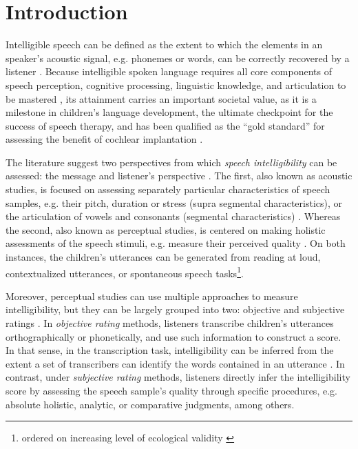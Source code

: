 \section{Introduction} \label{S:introduction}

Intelligible speech can be defined as the extent to which the elements in an speaker's acoustic signal, e.g. phonemes or words, can be correctly recovered by a listener \citep{Kent_et_al_1989, Whitehill_et_al_2004, vanHeuven_2008, Freeman_et_al_2017}. Because intelligible spoken language requires all core components of speech perception, cognitive processing, linguistic knowledge, and articulation to be mastered \citep{Freeman_et_al_2017}, its attainment carries an important societal value, as it is a milestone in children's language development, the ultimate checkpoint for the success of speech therapy, and has been qualified as the ``gold standard'' for assessing the benefit of cochlear implantation \citep{Chin_et_al_2012}. 

The literature suggest two perspectives from which \textit{speech intelligibility} can be assessed: the message and listener's perspective \citep{Boonen_et_al_2020, Boonen_et_al_2021}. The first, also known as acoustic studies, is focused on assessing separately particular characteristics of speech samples, e.g. their pitch, duration or stress (supra segmental characteristics), or the articulation of vowels and consonants (segmental characteristics) \citep{Rowe_et_al_2018}. Whereas the second, also known as perceptual studies, is centered on making holistic assessments of the speech stimuli, e.g. measure their perceived quality \citep{Boonen_et_al_2020, Boonen_et_al_2021}. On both instances, the children's utterances can be generated from reading at loud, contextualized utterances, or spontaneous speech tasks\footnote{ordered on increasing level of ecological validity \citep{Flipsen_2006,Ertmer_2011}}.

\begin{comment}
Based on their description, it seems that perceptual are more subjective than acoustic studies, as they do not rely on "objective" measurements, i.e. time duration, wave amplitude, among others, available in the former. However, for the case of SI, there are objective and subjective assessment methodologies.
\end{comment}

Moreover, perceptual studies can use multiple approaches to measure intelligibility, but they can be largely grouped into two: objective and subjective ratings \citep{Hustad_et_al_2020}. In \textit{objective rating} methods, listeners transcribe children's utterances orthographically or phonetically, and use such information to construct a score. In that sense, in the transcription task, intelligibility can be inferred from the extent a set of transcribers can identify the words contained in an utterance \cite{Boonen_et_al_2021}. In contrast, under \textit{subjective rating} methods, listeners directly infer the intelligibility score by assessing the speech sample's quality through specific procedures, e.g. absolute holistic, analytic, or comparative judgments, among others. 

